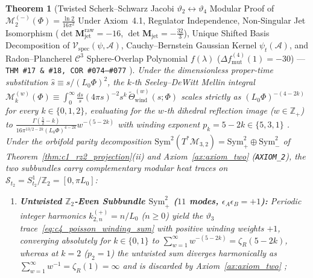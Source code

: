 \documentclass[11pt,a4paper]{article}
\newcommand{\catD}{\text{\textbf{\textcolor{blue!75!black}{[D]}}}}
\theoremstyle{definition}
\theoremstyle{plain}
\newtheorem{theorem}[axiom]{Theorem}
\theoremstyle{remark}
\begin{document}
\begin{theorem}[{Twisted Scherk--Schwarz Jacobi $\vartheta_2 \leftrightarrow \vartheta_4$ Modular Proof of $\mathcal{M}_2^{(-)}(\Phi) = \frac{\ln 2}{16\pi^2}$ Under Axiom~4.1, Regulator Independence, Non-Singular Jet Isomorphism ($\det\mathbf{M}_{\mathrm{jet}}^{\mathrm{raw}} = -16$, $\det\mathbf{M}_{\mathrm{jet}} = -\frac{32}{3}$), Unique Shifted Basis Decomposition of $\mathcal{V}_{\mathrm{spec}}(\psi, \mathcal{A})$, Cauchy--Bernstein Gaussian Kernel $\psi_t(\mathcal{A})$, and Radon--Plancherel $\mathcal{C}^3$ Sphere-Overlap Polynomial $f(\lambda)$ ($\Delta f_{\mathrm{mut}}^{(4)}(1) = -30$) --- \texttt{THM~\#17 \& \#18, COR~\#074--\#077} \catD}]\label{thm:c4_moments_and_potential}
Under the dimensionless proper-time substitution $\hat{s} \equiv s/(L_0\Phi)^2$, the $k$-th Seeley--DeWitt Mellin integral $\mathcal{M}_k^{(w)}(\Phi) \equiv \int_0^\infty \frac{ds}{s}(4\pi s)^{-2}s^k\,\widetilde{\Theta}_{\mathrm{wind}}^{(w)}(s;\Phi)$ scales strictly as $(L_0\Phi)^{-(4-2k)}$ for every $k \in \{0, 1, 2\}$, evaluating for the $w$-th dihedral reflection image ($w \in \mathbb{Z}_+$) to $\frac{\Gamma(\frac{5}{2}-k)}{16\pi^{13/2-2k}(L_0\Phi)^{4-2k}}w^{-(5-2k)}$ with winding exponent $p_k = 5 - 2k \in \{5, 3, 1\}$ \catD. Under the orbifold parity decomposition $\mathrm{Sym}^2(T^*\mathcal{M}_{3,2}) = \mathrm{Sym}^2_+ \oplus \mathrm{Sym}^2_-$ of Theorem~\ref{thm:c1_rz2_projection}(ii) and Axiom~\ref{ax:axiom_two} (\texttt{AXIOM\_2}), the two subbundles carry complementary modular heat traces on $\mathcal{S}_{t_2} = S^1_{t_2}/\mathbb{Z}_2 = [0, \pi L_0]$:
\begin{enumerate}[label=(\alph*)]
  \item \textbf{Untwisted $\mathbb{Z}_2$-Even Subbundle $\mathrm{Sym}^2_+$ ($11$ modes, $\epsilon_A\epsilon_B = +1$):} Periodic integer harmonics $k_{2,n}^{(+)} = n/L_0$ ($n \ge 0$) yield the $\vartheta_3$ trace~\eqref{eq:c4_poisson_winding_sum} with positive winding weights $+1$, converging absolutely for $k \in \{0, 1\}$ to $\sum_{w=1}^\infty w^{-(5-2k)} = \zeta_R(5 - 2k)$, whereas at $k = 2$ ($p_2 = 1$) the untwisted sum diverges harmonically as $\sum_{w=1}^\infty w^{-1} = \zeta_R(1) = \infty$ and is discarded by Axiom~\ref{ax:axiom_two} \catD;

\end{enumerate}
\end{theorem}
\end{document}

